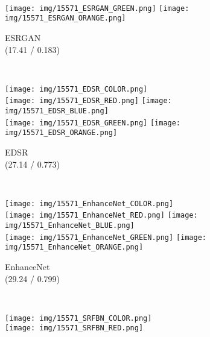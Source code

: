 \documentclass[10pt,twocolumn,letterpaper]{article}
\begin{document}
\begin{figure*}[t]
\begin{center}
\begin{subfigure}[b]{\SizeFigCompareHRLarge\textwidth}
        \\
        \texttt{[image: img/15571\_ESRGAN\_GREEN.png]}
        \texttt{[image: img/15571\_ESRGAN\_ORANGE.png]}
        \caption{ESRGAN~\cite{wang2018esrgan} \\ (17.41 / 0.183)}
        \label{fig:ESRGAN}
    \end{subfigure}
    ~
    \begin{subfigure}[b]{\SizeFigCompareHRLarge\textwidth}
        \texttt{[image: img/15571\_EDSR\_COLOR.png]}
        \\
        \texttt{[image: img/15571\_EDSR\_RED.png]}
        \texttt{[image: img/15571\_EDSR\_BLUE.png]}
        \\
        \texttt{[image: img/15571\_EDSR\_GREEN.png]}
        \texttt{[image: img/15571\_EDSR\_ORANGE.png]}
        \caption{EDSR~\cite{lim2017enhanced} \\ (27.14 / 0.773)}
        \label{fig:EDSR}
    \end{subfigure}
    ~
    \begin{subfigure}[b]{\SizeFigCompareHRLarge\textwidth}
        \texttt{[image: img/15571\_EnhanceNet\_COLOR.png]}
        \\
        \texttt{[image: img/15571\_EnhanceNet\_RED.png]}
        \texttt{[image: img/15571\_EnhanceNet\_BLUE.png]}
        \\
        \texttt{[image: img/15571\_EnhanceNet\_GREEN.png]}
        \texttt{[image: img/15571\_EnhanceNet\_ORANGE.png]}
        \caption{EnhanceNet~\cite{sajjadi2017enhancenet} \\ (29.24 / 0.799)}
        \label{fig:EnhanceNet}
    \end{subfigure}
    ~
    \begin{subfigure}[b]{\SizeFigCompareHRLarge\textwidth}
        \texttt{[image: img/15571\_SRFBN\_COLOR.png]}
        \\
        \texttt{[image: img/15571\_SRFBN\_RED.png]}

\end{subfigure}
\end{center}
\end{figure*}
\end{document}

